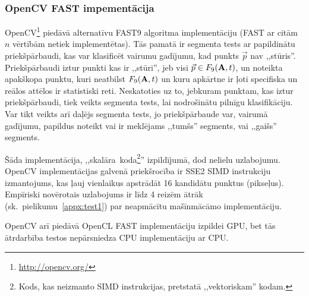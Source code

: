 \subsubsection{OpenCV FAST impementācija} \label{sec:fast-ocv}
OpenCV\footnote{\url{http://opencv.org/}} piedāvā alternatīvu FAST9 algoritma
implementāciju (FAST ar citām $n$ vērtībām netiek implementētas).
Tās pamatā ir segmenta tests ar papildinātu
priekšpārbaudi\cite{Rosten-tracking}\cite{FAST}, kas var klasificēt vairumu
gadījumu, kad punkts $\vec{p}$ nav ,,stūris''. Priekšpārbaudi iztur
punkti kas ir ,,stūri'', jeb visi $\vec{p} \in F_9(\mathbf{A}, t)$,
un noteikta apakškopa punktu, kuri neatbilst $F_9(\mathbf{A}, t)$ un kuru
apkārtne ir ļoti specifiska un reālos attēlos ir statistiski reti.
Neskatoties
uz to, jebkuram punktam, kas iztur priekšpārbaudi, tiek veikts segmenta
tests, lai nodrošinātu pilnīgu klasifikāciju.
Var tikt veikts arī daļējs segmenta tests, jo priekšpārbaude var,
vairumā gadījumu, papildus noteikt vai ir meklējams ,,tumšs'' segments, vai
,,gaišs'' segments.

Šāda implementācija, ,,skalāra~koda\footnote{Kods, kas neizmanto SIMD
	instrukcijas, pretstatā ,,vektoriskam'' kodam.}''
izpildījumā, dod nelielu uzlabojumu. OpenCV implementācijas galvenā
priekšrocība ir SSE2 SIMD instrukciju izmantojums, kas ļauj vienlaikus
apstrādāt 16 kandidātu punktus (pikseļus). Empīriski novērotais
uzlabojums ir līdz 4 reizēm ātrāk (sk.~pielikumu~\ref{appx:test1})
par neapmācītu mašīnmācāmo implementāciju.

OpenCV arī piedāvā OpenCL FAST implementāciju izpildei GPU, bet tās
ātrdarbība testos nepārsniedza CPU implementāciju ar CPU.

